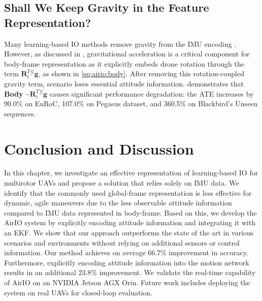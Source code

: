 \subsection{Shall We Keep Gravity in the Feature Representation?}
Many learning-based IO methods remove gravity from the IMU encoding \cite{bajwa2024dive}. However, as discussed in , gravitational acceleration is a critical component for body-frame representation as it explicitly embeds drone rotation through the term $\mathbf{R}^T_i {}^\mathcal{G}\mathbf{g}$, as shown in \ref{eq:airio:body}.
After removing this rotation-coupled gravity term, scenario  loses essential attitude information.  demonstrates that  \textbf{Body --$\mathbf{R}^T_i {}^\mathcal{G}\mathbf{g}$} causes significant performance degradation: the ATE increases by 90.0\% on EuRoC, 107.0\% on Pegasus dataset, and 360.5\% on Blackbird's Unseen sequences.


% 


\section{Conclusion and Discussion}
\label{sec:airio:conclusion}

In this chapter, we investigate an effective representation of learning-based IO for multirotor UAVs and propose a solution that relies solely on IMU data. We identify that the commonly used global-frame representation is less effective for dynamic, agile maneuvers due to the less observable attitude information compared to IMU data represented in body-frame.
Based on this, we develop the AirIO system by explicitly encoding attitude information and integrating it with an EKF.
We show that our approach outperforms the state of the art \cite{CioffiRal2023} in various scenarios and environments without relying on additional sensors or control information. Our method achieves on average 66.7\% improvement in accuracy. Furthermore, explicitly encoding attitude information into the motion network results in an additional 23.8\% improvement.
We validate the real-time capability of AirIO on an NVIDIA Jetson AGX Orin. Future work includes deploying the system on real UAVs for closed-loop evaluation.
